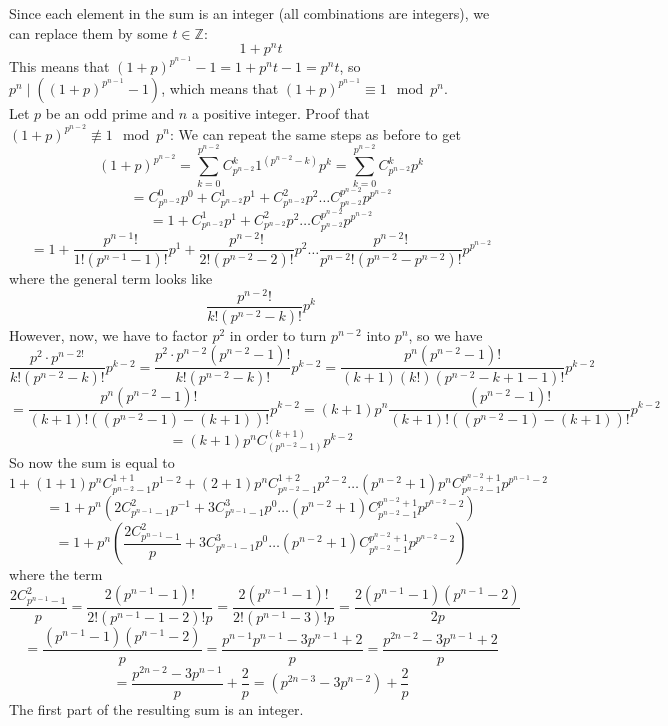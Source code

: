 \documentclass{article}
\newcommand{\Z}{\mathbb{Z}}
\begin{document}
    Since each element in the sum is an integer
    (all combinations are integers),
    we can replace them by some $t \in \Z$:
    \[ 1 + p^nt\]
    This means that $(1 + p)^{p^{n-1}} - 1 = 1 + p^nt - 1
    = p^nt$,
    so $p^n \mid ((1 + p)^{p^{n-1}} - 1)$,
    which means that $(1 + p)^{p^{n-1}} \equiv 1 \mod p^n$. \\
    Let $p$ be an odd prime and $n$ a positive integer.
    Proof that $(1 + p)^{p^{n-2}} \not\equiv 1 \mod p^n$:
    We can repeat the same steps as before to get 
    \[ (1 + p)^{p^{n-2}}
    = \sum_{k = 0}^{p^{n-2}} C_{p^{n-2}}^{k}1^{(p^{n-2} - k)}p^k
    = \sum_{k = 0}^{p^{n-2}} C_{p^{n-2}}^{k}p^k \]
    \[ = C_{p^{n-2}}^0p^0 + C_{p^{n-2}}^1p^1 + C_{p^{n-2}}^2p^{2}
    \dots C_{p^{n-2}}^{p^{n-2}}p^{p^{n-2}} \]
    \[ = 1 + C_{p^{n-2}}^1p^1 + C_{p^{n-2}}^2p^2
    \dots C_{p^{n-2}}^{p^{n-2}}p^{p^{n-2}} \]
    \[ = 1 + \dfrac{p^{n-1}!}{1!(p^{n-1} - 1)!}p^1
    + \dfrac{p^{n-2}!}{2!(p^{n-2} - 2)!}p^2 \dots
    \dfrac{p^{n-2}!}{p^{n-2}!(p^{n-2} - p^{n-2})!}p^{p^{n-2}} \]
    where the general term looks like
    \[ \dfrac{p^{n-2}!}{k!(p^{n-2} - k)!}p^k \]
    However, now, we have to factor $p^2$ in order to turn
    $p^{n-2}$ into $p^n$, so we have
    \[ \dfrac{p^2 \cdot p^{n-2!}}{k!(p^{n-2} - k)!}p^{k-2}
    = \dfrac{p^2 \cdot p^{n-2}(p^{n-2} - 1)!}{k!(p^{n-2} - k)!}p^{k-2}
    = \dfrac{p^n(p^{n-2} - 1)!}{(k+1)(k!)(p^{n-2} - k + 1 - 1)!}p^{k-2} \]
    \[ = \dfrac{p^n(p^{n-2} - 1)!}{(k + 1)!((p^{n-2} - 1)-(k + 1))!}p^{k-2}
    = (k+1)p^n \dfrac{(p^{n-2}-1)!}{(k + 1)!((p^{n-2}-1)-(k + 1))!}p^{k-2} \]
    \[ = (k+1)p^n C_{(p^{n-2} - 1)}^{(k+1)} p^{k-2} \]
    So now the sum is equal to
    \[ 1 + (1 + 1)p^nC_{p^{n-2} - 1}^{1 + 1}p^{1-2}
    + (2+1)p^nC_{p^{n-2} - 1}^{1 + 2}p^{2-2} \dots
    (p^{n-2}+1)p^nC_{p^{n-2} - 1}^{p^{n-2} + 1}p^{p^{n-1}-2} \]
    \[ = 1 + p^n(2C_{p^{n-1} - 1}^{2}p^{-1}
    + 3C_{p^{n-1} - 1}^{3}p^{0} \dots
    (p^{n-2}+1)C_{p^{n-2} - 1}^{p^{n-2} + 1}p^{p^{n-2}-2}) \]
    \[ = 1 + p^n( \dfrac{2C_{p^{n-1} - 1}^{2}}{p}
    + 3C_{p^{n-1} - 1}^{3}p^{0} \dots
    (p^{n-2}+1)C_{p^{n-2} - 1}^{p^{n-2} + 1}p^{p^{n-2}-2}) \]
    where the term
    \[ \dfrac{2C_{p^{n-1} - 1}^{2}}{p}
    = \dfrac{2(p^{n-1} - 1)!}{2!(p^{n-1} - 1 - 2)!p} 
    = \dfrac{2(p^{n-1} - 1)!}{2!(p^{n-1} - 3)!p}
    = \dfrac{2(p^{n-1} - 1)(p^{n-1} - 2)}{2p} \]
    \[ = \dfrac{(p^{n-1} - 1)(p^{n-1} - 2)}{p}
    = \dfrac{p^{n-1}p^{n-1} - 3p^{n-1} + 2}{p}
    = \dfrac{p^{2n-2} - 3p^{n-1} + 2}{p} \]
    \[ = \dfrac{p^{2n-2} - 3p^{n-1}}{p} + \dfrac{2}{p} 
    = (p^{2n-3} - 3p^{n-2}) + \dfrac{2}{p} \]
    The first part of the resulting sum is an integer.
\end{document}

